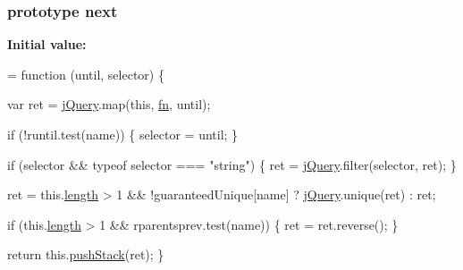 \subsubsection[{\texorpdfstring{next}{next}}]{ {\bf prototype} next}\hypertarget{jquery-2_82_81-vsdoc_8js_a61213ec31ab21de6b8fbe75332157524}{}\label{jquery-2_82_81-vsdoc_8js_a61213ec31ab21de6b8fbe75332157524}
{\bfseries Initial value\+:}
\begin{DoxyCode}
= \textcolor{keyword}{function} (until, selector) \{
        

        var ret = \hyperlink{jquery-2_82_81-vsdoc_8js_add5237586d970a38a81f990e8eb28c6c}{jQuery}.map(\textcolor{keyword}{this}, \hyperlink{jquery-2_82_81-vsdoc_8js_acef6bdaf6b9b20fdcca1ea86f0902c3b}{fn}, until);

        \textcolor{keywordflow}{if} (!runtil.test(name)) \{
            selector = until;
        \}

        \textcolor{keywordflow}{if} (selector && typeof selector === \textcolor{stringliteral}{"string"}) \{
            ret = \hyperlink{jquery-2_82_81-vsdoc_8js_add5237586d970a38a81f990e8eb28c6c}{jQuery}.filter(selector, ret);
        \}

        ret = this.\hyperlink{jquery-2_82_81-vsdoc_8js_aa7de35d58da66d9944ab9cbe82c19640}{length} > 1 && !guaranteedUnique[name] ? \hyperlink{jquery-2_82_81-vsdoc_8js_add5237586d970a38a81f990e8eb28c6c}{jQuery}.unique(ret) : ret;

        \textcolor{keywordflow}{if} (this.\hyperlink{jquery-2_82_81-vsdoc_8js_aa7de35d58da66d9944ab9cbe82c19640}{length} > 1 && rparentsprev.test(name)) \{
            ret = ret.reverse();
        \}

        \textcolor{keywordflow}{return} this.\hyperlink{jquery-2_82_81-vsdoc_8js_afc3a7db1ef2b526338c06c07cecccd44}{pushStack}(ret);
    \}
\end{DoxyCode}

